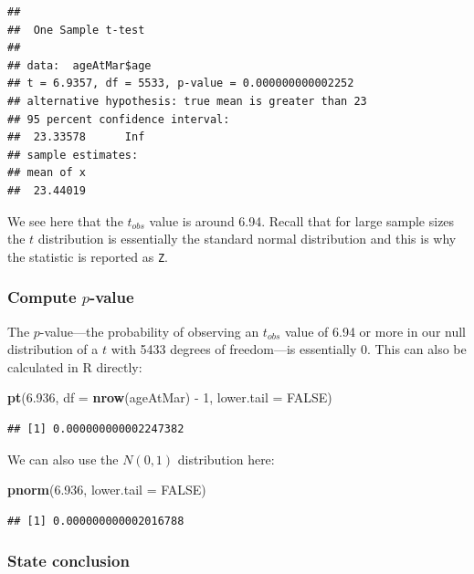 \documentclass[]{tufte-book}
\newenvironment{Shaded}{\begin{snugshade}}{\end{snugshade}}
\newcommand{\KeywordTok}[1]{\textcolor[rgb]{0.13,0.29,0.53}{\textbf{{#1}}}}
\newcommand{\DataTypeTok}[1]{\textcolor[rgb]{0.13,0.29,0.53}{{#1}}}
\newcommand{\DecValTok}[1]{\textcolor[rgb]{0.00,0.00,0.81}{{#1}}}
\newcommand{\FloatTok}[1]{\textcolor[rgb]{0.00,0.00,0.81}{{#1}}}
\newcommand{\StringTok}[1]{\textcolor[rgb]{0.31,0.60,0.02}{{#1}}}
\newcommand{\OtherTok}[1]{\textcolor[rgb]{0.56,0.35,0.01}{{#1}}}
\newcommand{\NormalTok}[1]{{#1}}
\begin{document}
\begin{verbatim}
## 
##  One Sample t-test
## 
## data:  ageAtMar$age
## t = 6.9357, df = 5533, p-value = 0.000000000002252
## alternative hypothesis: true mean is greater than 23
## 95 percent confidence interval:
##  23.33578      Inf
## sample estimates:
## mean of x 
##  23.44019
\end{verbatim}

We see here that the \(t_{obs}\) value is around 6.94. Recall that for
large sample sizes the \(t\) distribution is essentially the standard
normal distribution and this is why the statistic is reported as
\texttt{Z}.

\subsubsection{\texorpdfstring{Compute
\(p\)-value}{Compute p-value}}\label{compute-p-value}

The \(p\)-value---the probability of observing an \(t_{obs}\) value of
6.94 or more in our null distribution of a \(t\) with 5433 degrees of
freedom---is essentially 0. This can also be calculated in R directly:

\begin{Shaded}
\begin{Highlighting}[]
\KeywordTok{pt}\NormalTok{(}\FloatTok{6.936}\NormalTok{, }\DataTypeTok{df =} \KeywordTok{nrow}\NormalTok{(ageAtMar) -}\StringTok{ }\DecValTok{1}\NormalTok{, }\DataTypeTok{lower.tail =} \OtherTok{FALSE}\NormalTok{)}
\end{Highlighting}
\end{Shaded}

\begin{verbatim}
## [1] 0.000000000002247382
\end{verbatim}

We can also use the \(N(0, 1)\) distribution here:

\begin{Shaded}
\begin{Highlighting}[]
\KeywordTok{pnorm}\NormalTok{(}\FloatTok{6.936}\NormalTok{, }\DataTypeTok{lower.tail =} \OtherTok{FALSE}\NormalTok{)}
\end{Highlighting}
\end{Shaded}

\begin{verbatim}
## [1] 0.000000000002016788
\end{verbatim}

\subsubsection{State conclusion}\label{state-conclusion}
\end{document}
